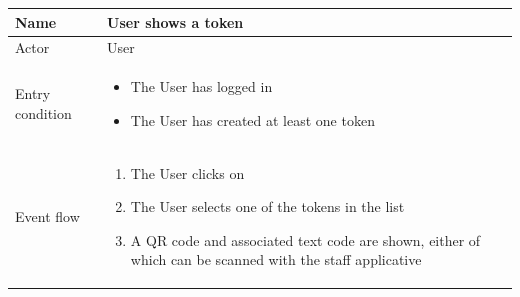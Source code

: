 \begin{table}[H]
    \begin{tabu} to \textwidth {|X|X[4]|}
        \hline
        Name            & User shows a token         \\ \hline
        Actor           & User                       \\ \hline
        Entry condition & \begin{itemize}
            \item The User has logged in
            \item The User has created at least one token
        \end{itemize} \\ \hline
        Event flow      & \begin{enumerate}
            \item The User clicks on 
            \item The User selects one of the tokens in the list
            \item A QR code and associated text code are shown, either of which can be scanned with the staff applicative
        \end{enumerate} \\ \hline
    \end{tabu}
\end{table}


